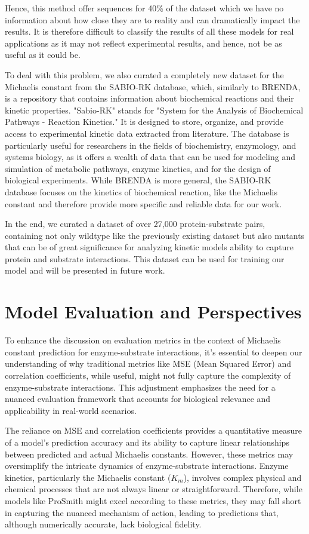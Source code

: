 Hence, this method offer sequences for 40\% of the dataset which we have no information about how close they are to reality and can dramatically impact the results. It is therefore difficult to classify the results of all these models for real applications as it may not reflect experimental results, and hence, not be as useful as it could be.

To deal with this problem, we also curated a completely new dataset for the Michaelis constant from the
SABIO-RK database, which, similarly to BRENDA, is a repository that contains information about biochemical reactions and their kinetic properties. "Sabio-RK" stands for "System for the Analysis of Biochemical Pathways - Reaction Kinetics." It is designed to store, organize, and provide access to experimental kinetic data extracted from literature. The database is particularly useful for researchers in the fields of biochemistry, enzymology, and systems biology, as it offers a wealth of data that can be used for modeling and simulation of metabolic pathways, enzyme kinetics, and for the design of biological experiments. While BRENDA is more general, the SABIO-RK database focuses on the kinetics of biochemical reaction, like the Michaelis constant and therefore provide more specific and reliable data for our work.

In the end, we curated a dataset of over 27,000 protein-substrate pairs, containing not only wildtype like the previously existing dataset but also mutants that can be of great significance for analyzing kinetic models ability to capture protein and substrate interactions. This dataset can be used for training our model and will be presented in future work.

\section{Model Evaluation and Perspectives}
To enhance the discussion on evaluation metrics in the context of Michaelis constant prediction for enzyme-substrate interactions, it’s essential to deepen our understanding of why traditional metrics like MSE (Mean Squared Error) and correlation coefficients, while useful, might not fully capture the complexity of enzyme-substrate interactions. This adjustment emphasizes the need for a nuanced evaluation framework that accounts for biological relevance and applicability in real-world scenarios.

The reliance on MSE and correlation coefficients provides a quantitative measure of a model's prediction accuracy and its ability to capture linear relationships between predicted and actual Michaelis constants. However, these metrics may oversimplify the intricate dynamics of enzyme-substrate interactions. Enzyme kinetics, particularly the Michaelis constant ($K_m$), involves complex physical and chemical processes that are not always linear or straightforward. Therefore, while models like ProSmith might excel according to these metrics, they may fall short in capturing the nuanced mechanism of action, leading to predictions that, although numerically accurate, lack biological fidelity.

